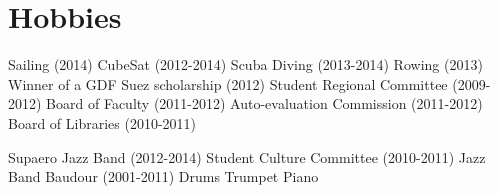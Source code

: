\documentclass[a4paper]{deedy-resume} %
\begin{document}
\begin{minipage}[t]{0.25\textwidth}
\sectionspace %


\section{Hobbies}

Sailing (2014) \textbullet{} CubeSat (2012-2014) \textbullet{} Scuba Diving (2013-2014) \textbullet{} Rowing (2013) \textbullet{} Winner of a GDF Suez scholarship (2012) \textbullet{}  Student Regional Committee (2009-2012) \textbullet{} Board of Faculty (2011-2012)  \textbullet{} Auto-evaluation Commission (2011-2012) \textbullet{} Board of Libraries (2010-2011)
\vspace{3pt}


Supaero Jazz Band (2012-2014) \textbullet{} Student Culture Committee (2010-2011) \textbullet{} Jazz Band Baudour (2001-2011) \textbullet{} Drums \textbullet{} Trumpet \textbullet{} Piano

\sectionspace %


\end{minipage} %
\hfill
%
%
\end{document}
